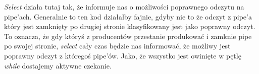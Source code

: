 \textit{Select} działa tutaj tak, że informuje nas o możliwości poprawnego odczytu na pipe'ach. Generalnie to ten kod działalby fajnie, gdyby nie to że odczyt z pipe'a który jest zamknięty po drugiej stronie klasyfikowany jest jako poprawny odczyt. To oznacza, że gdy któryś z producentów przestanie produkować i zamknie pipe po swojej stronie, \textit{select} cały czas będzie nas informować, że możliwy jest poprawny odczyt z któregoś pipe'ów. Jako, że wszystko jest owinięte w pętlę \textit{while} dostajemy aktywne czekanie.